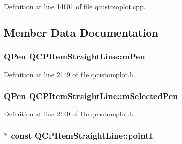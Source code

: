 Definition at line 14601 of file qcustomplot.\-cpp.



\subsection{Member Data Documentation}
\hypertarget{class_q_c_p_item_straight_line_a15106ddc2ebd73ed5c1bc57aa92bee8f}{
\subsubsection[{m\-Pen}]{\setlength{\rightskip}{0pt plus 5cm}Q\-Pen Q\-C\-P\-Item\-Straight\-Line\-::m\-Pen\hspace{0.3cm}{\ttfamily [protected]}}}\label{class_q_c_p_item_straight_line_a15106ddc2ebd73ed5c1bc57aa92bee8f}


Definition at line 2149 of file qcustomplot.\-h.

\hypertarget{class_q_c_p_item_straight_line_a0307a0d56a018656adbf798bc84c2a4b}{
\subsubsection[{m\-Selected\-Pen}]{\setlength{\rightskip}{0pt plus 5cm}Q\-Pen Q\-C\-P\-Item\-Straight\-Line\-::m\-Selected\-Pen\hspace{0.3cm}{\ttfamily [protected]}}}\label{class_q_c_p_item_straight_line_a0307a0d56a018656adbf798bc84c2a4b}


Definition at line 2149 of file qcustomplot.\-h.

\hypertarget{class_q_c_p_item_straight_line_ac131a6ffe456f2cc7364dce541fe0120}{
\subsubsection[{point1}]{$\ast$ const Q\-C\-P\-Item\-Straight\-Line\-::point1}}\label{class_q_c_p_item_straight_line_ac131a6ffe456f2cc7364dce541fe0120}


